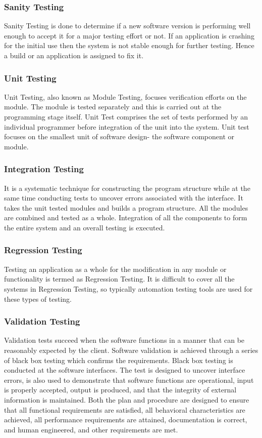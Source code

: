 \documentclass[oneside, 12pt]{book}
\begin{document}
\subsubsection{Sanity Testing}
Sanity Testing is done to determine if a new software version is performing well enough to accept it for a major testing effort or not. If an application is crashing for the initial use then the system is not stable enough for further testing. Hence a build or an application is assigned to fix it.
\subsubsection{Unit Testing}
Unit Testing, also known as Module Testing, focuses verification efforts on the module. The module is tested separately and this is carried out at the programming stage itself. Unit Test comprises the set of tests performed by an individual programmer before integration of the unit into the system. Unit test focuses on the smallest unit of software design- the software component or module.
\subsubsection{Integration Testing}
It is a systematic technique for constructing the program structure while at the same time conducting tests to uncover errors associated with the interface. It takes the unit tested modules and builds a program structure. All the modules are combined and tested as a whole. Integration of all the components to form the entire system and an overall testing is executed.
\subsubsection{Regression Testing}
Testing an application as a whole for the modification in any module or functionality is termed as Regression Testing. It is difficult to cover all the systems in Regression Testing, so typically automation testing tools are used for these types of testing.
\subsubsection{Validation Testing}
Validation tests succeed when the software functions in a manner that can be reasonably expected by the client. Software validation is achieved through a series of black box testing which confirms the requirements. Black box testing is conducted at the software interfaces. The test is designed to uncover interface errors, is also used to demonstrate that software functions are operational, input is properly accepted, output is produced, and that the integrity of external information is maintained. Both the plan and procedure are designed to ensure that all functional requirements are satisfied, all behavioral characteristics are achieved, all performance requirements are attained, documentation is correct, and human engineered, and other requirements are met.
\end{document}
